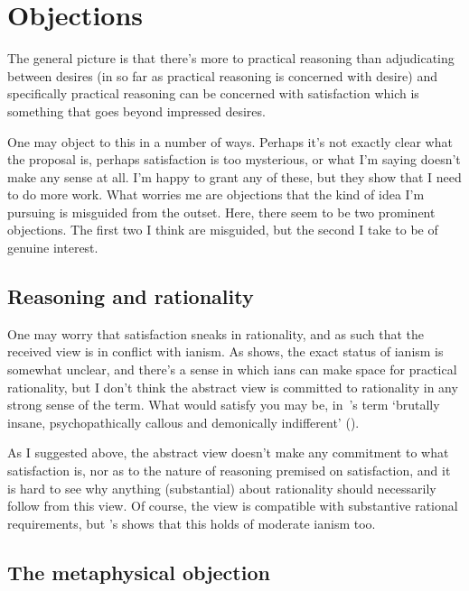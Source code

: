\documentclass[10pt]{article}
\begin{document}
\newpage

\section{Objections}
\label{sec:objections}

The general picture is that there's more to practical reasoning than adjudicating between desires (in so far as practical reasoning is concerned with desire) and specifically practical reasoning can be concerned with satisfaction which is something that goes beyond impressed desires.

One may object to this in a number of ways.
Perhaps it's not exactly clear what the proposal is, perhaps satisfaction is too mysterious, or what I'm saying doesn't make any sense at all.
I'm happy to grant any of these, but they show that I need to do more work.
What worries me are objections that the kind of idea I'm pursuing is misguided from the outset.
Here, there seem to be two prominent objections.
The first two I think are misguided, but the second I take to be of genuine interest.

\subsection{Reasoning and rationality}
\label{sec:reas-rati}

One may worry that satisfaction sneaks in rationality, and as such that the received view is in conflict with \citeauthor{Hume:2011aa}ianism.
As \textcite{Smith:2004aa} shows, the exact status of \citeauthor{Hume:2011aa}ianism is somewhat unclear, and there's a sense in which \citeauthor{Hume:2011aa}ians can make space for practical rationality, but I don't think the abstract view is committed to rationality in any strong sense of the term.
What would satisfy you may be, in~\cite{Johnston:1989aa}'s term `brutally insane, psychopathically callous and demonically indifferent' (\citeyear[161]{Johnston:1989aa}).

As I suggested above, the abstract view doesn't make any commitment to what satisfaction is, nor as to the nature of reasoning premised on satisfaction, and it is hard to see why anything (substantial) about rationality should necessarily follow from this view.
Of course, the view is compatible with substantive rational requirements, but \citeauthor{Smith:2004aa}'s shows that this holds of moderate \citeauthor{Hume:2011aa}ianism too.

\subsection{The metaphysical objection}
\label{sec:metaphysics}
\end{document}
